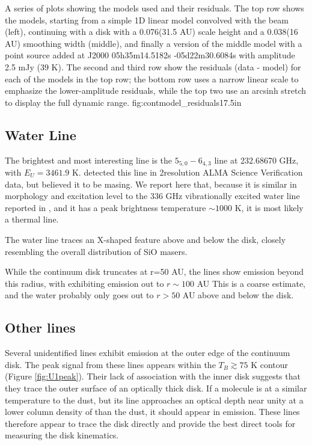 \documentclass[twocolumn]{aastex61}
\begin{document}
{A series of plots showing the models used and their residuals.
The top row shows the models, starting from a simple 1D linear model
convolved with the beam (left), continuing with a disk with a 0.076\arcsec (31.5 AU)
scale height and a 0.038\arcsec (16 AU) smoothing width (middle), and finally
a version of the middle model with a point source added at 
J2000 05h35m14.5182s -05d22m30.6084s with amplitude 2.5 mJy (39 K).
The second and third row show the residuals (data - model) for each of the models
in the top row; the bottom row uses a narrow linear scale to emphasize the lower-amplitude
residuals, while the top two use an arcsinh stretch to display the full dynamic range.
}
{fig:contmodel_residuals}{1}{7.5in}



\subsection{Water Line}
The brightest and most interesting line is the \water $5_{5,0}-6_{4,3}$ line at
232.68670 GHz, with $E_U=3461.9$ K.  \citet{Hirota2012a} detected this line
in 2\arcsec resolution ALMA Science Verification data, but believed it to be
masing.  We report here that, because it is similar in morphology and
excitation level to the 336 GHz vibrationally excited water line reported in
\citet{Hirota2014a}, and it has a peak brightness temperature $\sim1000$ K, it
is most likely a thermal line.

The water line traces an X-shaped feature above and below the disk, closely
resembling the overall distribution of SiO masers.

While the continuum disk truncates at r=50 AU, the lines show emission
beyond this radius, with \water exhibiting emission out to $r\sim100$ AU
{\color{red} This is a coarse estimate, and the water probably only goes out to
$r>50$ AU above and below the disk}.

\subsection{Other lines}
Several unidentified lines exhibit emission at the outer edge of the continuum disk.
The peak signal from these lines appears within the $T_B\gtrsim75$ K contour
(Figure \ref{fig:U1peak}).
Their lack of association with the inner disk suggests that they trace the outer
surface of an optically thick disk.
If a molecule is at a similar temperature to the dust, but its line approaches
an optical depth near unity at a lower column density of \hh than the dust,
it should appear in emission.  These lines therefore appear to trace the disk
directly and provide the best direct tools for measuring the disk kinematics.
\end{document}
